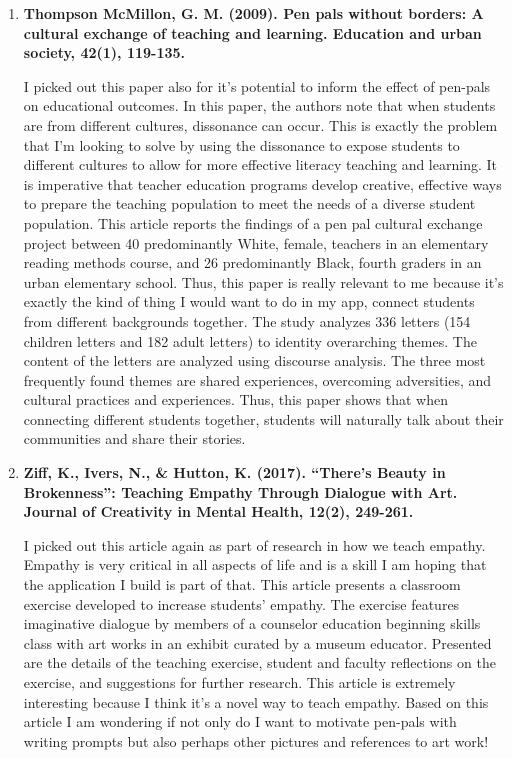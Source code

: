 \documentclass[12pt, final]{article}
\begin{document}
\begin{enumerate}
\item \textbf{Thompson McMillon, G. M. (2009). Pen pals without borders: A cultural exchange of teaching and learning. Education and urban society, 42(1), 119-135.}

I picked out this paper also for it's potential to inform the effect of pen-pals on educational outcomes. In this paper, the authors note that when students are from different cultures, dissonance can occur. This is exactly the problem that I'm looking to solve by using the dissonance to expose students to different cultures to allow for more effective literacy teaching and learning. It is imperative that teacher education programs develop creative, effective ways to prepare the teaching population to meet the needs of a diverse student population. This article reports the findings of a pen pal cultural exchange project between 40 predominantly White, female,  teachers in an elementary reading methods course, and 26 predominantly Black, fourth graders in an urban elementary school. Thus, this paper is really relevant to me because it's exactly the kind of thing I would want to do in my app, connect students from different backgrounds together. The study analyzes 336 letters (154 children letters and 182 adult letters) to identity overarching themes. The content of the letters are analyzed using discourse analysis. The three most frequently found themes are shared experiences, overcoming adversities, and cultural practices and experiences. Thus, this paper shows that when connecting different students together, students will naturally talk about their communities and share their stories. 

\item \textbf{Ziff, K., Ivers, N., \& Hutton, K. (2017). “There’s Beauty in Brokenness”: Teaching Empathy Through Dialogue with Art. Journal of Creativity in Mental Health, 12(2), 249-261.}

I picked out this article again as part of research in how we teach empathy. Empathy is very critical in all aspects of life and is a skill I am hoping that the application I build is part of that. This article presents a classroom exercise developed to increase students' empathy. The exercise features imaginative dialogue by members of a counselor education beginning skills class with art works in an exhibit curated by a museum educator. Presented are the details of the teaching exercise, student and faculty reflections on the exercise, and suggestions for further research. This article is extremely interesting because I think it's a novel way to teach empathy. Based on this article I am wondering if not only do I want to motivate pen-pals with writing prompts but also perhaps other pictures and references to art work!

\end{enumerate}
\end{document}
